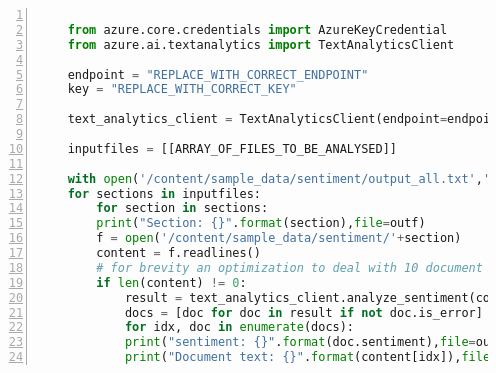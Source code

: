 \noindent\begin{minipage}[h]{\textwidth}
    \begin{lstlisting}[language=Python, numbers=left, caption=Text Analytics code, captionpos=b, label=listing:text_analytics, breaklines=true]

    from azure.core.credentials import AzureKeyCredential
    from azure.ai.textanalytics import TextAnalyticsClient
    
    endpoint = "REPLACE_WITH_CORRECT_ENDPOINT"
    key = "REPLACE_WITH_CORRECT_KEY"
    
    text_analytics_client = TextAnalyticsClient(endpoint=endpoint, credential=AzureKeyCredential(key))
    
    inputfiles = [[ARRAY_OF_FILES_TO_BE_ANALYSED]]
    
    with open('/content/sample_data/sentiment/output_all.txt','a') as outf:
    for sections in inputfiles:
        for section in sections:
        print("Section: {}".format(section),file=outf)
        f = open('/content/sample_data/sentiment/'+section)
        content = f.readlines()
        # for brevity an optimization to deal with 10 document limit is removed
        if len(content) != 0:
            result = text_analytics_client.analyze_sentiment(content, show_opinion_mining=True)
            docs = [doc for doc in result if not doc.is_error]
            for idx, doc in enumerate(docs):
            print("sentiment: {}".format(doc.sentiment),file=outf)
            print("Document text: {}".format(content[idx]),file=outf)
    \end{lstlisting}
\end{minipage}


